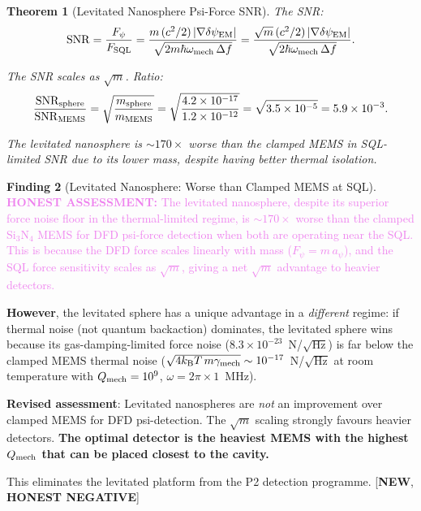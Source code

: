 \documentclass[11pt]{article}
\newcommand{\ee}[1]{\times 10^{#1}}
\newcommand{\kB}{k_{\mathrm{B}}}
\newcommand{\SNR}{\mathrm{SNR}}
\newcommand{\dpsiEM}{\delta\psi_{\rm EM}}
\newcommand{\honest}[1]{\textcolor{violet}{\textbf{HONEST ASSESSMENT:} #1}}
\newtheorem{theorem}{Theorem}[section]
\theoremstyle{definition}
\newtheorem{finding}[theorem]{Finding}
\theoremstyle{remark}
\begin{document}
\begin{theorem}[Levitated Nanosphere Psi-Force SNR]
The SNR:
\begin{equation}
\SNR = \frac{F_\psi}{F_{\rm SQL}} = \frac{m\,(c^2/2)\,|\nabla\dpsiEM|}
{\sqrt{2m\hbar\omega_{\rm mech}\,\Delta f}}
= \frac{\sqrt{m}\,(c^2/2)\,|\nabla\dpsiEM|}
{\sqrt{2\hbar\omega_{\rm mech}\,\Delta f}}.
\label{eq:SNR_mass_scaling}
\end{equation}

The SNR scales as $\sqrt{m}$. Ratio:
\begin{equation}
\frac{\SNR_{\rm sphere}}{\SNR_{\rm MEMS}}
= \sqrt{\frac{m_{\rm sphere}}{m_{\rm MEMS}}}
= \sqrt{\frac{4.2\ee{-17}}{1.2\ee{-12}}} = \sqrt{3.5\ee{-5}} = 5.9\ee{-3}.
\end{equation}

The levitated nanosphere is $\sim 170\times$ \emph{worse} than the
clamped MEMS in SQL-limited SNR due to its lower mass, despite having
better thermal isolation.
\end{theorem}

\begin{finding}[Levitated Nanosphere: Worse than Clamped MEMS at SQL]
\label{find:levitated_honest}
\honest{The levitated nanosphere, despite its superior force noise floor
in the thermal-limited regime, is $\sim 170\times$ worse than the
clamped Si$_3$N$_4$ MEMS for DFD psi-force detection when both are
operating near the SQL. This is because the DFD force scales linearly
with mass ($F_\psi = m\,a_\psi$), and the SQL force sensitivity scales
as $\sqrt{m}$, giving a net $\sqrt{m}$ advantage to heavier detectors.}

\textbf{However}, the levitated sphere has a unique advantage in a
\emph{different} regime: if thermal noise (not quantum backaction)
dominates, the levitated sphere wins because its gas-damping-limited
force noise ($8.3\ee{-23}$~N/$\sqrt{\text{Hz}}$) is far below the
clamped MEMS thermal noise ($\sqrt{4\kB T\,m\gamma_{\rm mech}}
\sim 10^{-17}$~N/$\sqrt{\text{Hz}}$ at room temperature with
$Q_{\rm mech} = 10^9$, $\omega = 2\pi\times 1$~MHz).

\textbf{Revised assessment}: Levitated nanospheres are \emph{not} an
improvement over clamped MEMS for DFD psi-detection. The $\sqrt{m}$
scaling strongly favours heavier detectors. \textbf{The optimal detector
is the heaviest MEMS with the highest $Q_{\rm mech}$ that can be
placed closest to the cavity.}

This eliminates the levitated platform from the P2 detection programme.
[\textbf{NEW}, \textbf{HONEST NEGATIVE}]
\end{finding}
\end{document}
